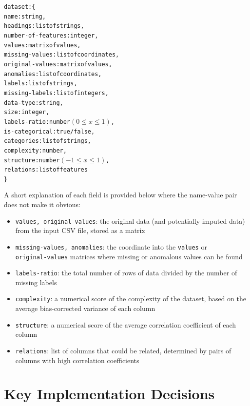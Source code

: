 \documentclass[a4paper,titlepage]{article}
\begin{document}
\begin{alltt}
  dataset: \{
    name: string,
    headings: list of strings,
    number-of-features: integer,
    values: matrix of values,
    missing-values: list of coordinates,
    original-values\footnotemark: matrix of values,
    anomalies: list of coordinates,
    labels: list of strings,
    missing-labels: list of integers,
    data-type: string,
    size: integer,
    labels-ratio: number \((0 \leq x \leq 1)\),
    is-categorical: true / false,
    categories\footnotemark: list of strings, 
    complexity: number,
    structure: number \((-1 \leq x \leq 1)\),
    relations: list of features
  \}
\end{alltt}

A short explanation of each field is provided below where the name-value pair does not make it obvious:
\begin{itemize}
  \item \verb|values, original-values|: the original data (and potentially imputed data) from the input CSV file, stored as a matrix
  \item \verb|missing-values, anomalies|: the coordinate into the \verb|values| or \\\verb|original-values| matrices where missing or anomalous values can be found
  \item \verb|labels-ratio|: the total number of rows of data divided by the number of missing labels
  \item \verb|complexity|: a numerical score of the complexity of the dataset, based on the average bias-corrected variance of each column
  \item \verb|structure|: a numerical score of the average correlation coefficient of each column
  \item \verb|relations|: list of columns that could be related, determined by pairs of columns with high correlation coefficients
\end{itemize}

\section{Key Implementation Decisions}
\end{document}
